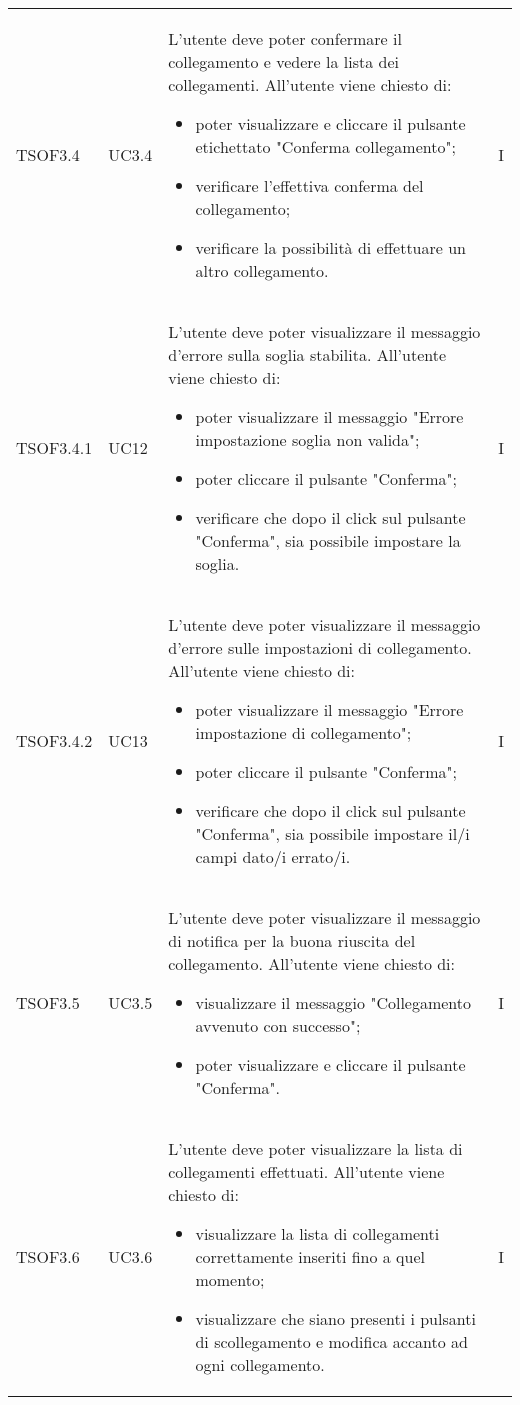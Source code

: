 \begin{longtable}{C{2.5cm} C{2.5cm} L{8cm} C{2cm}}
TSOF3.4 &
UC3.4 &
L'utente  deve poter confermare il collegamento e vedere la lista dei collegamenti. All'utente viene chiesto di:
\begin{itemize}
	\item poter visualizzare e cliccare il pulsante etichettato "Conferma collegamento";
	\item verificare l'effettiva conferma del collegamento;
	\item verificare la possibilità di effettuare un altro collegamento.
\end{itemize}&
I \\

TSOF3.4.1 &
UC12 &
L'utente  deve poter visualizzare il messaggio d'errore sulla soglia stabilita. All'utente viene chiesto di:
\begin{itemize}
	\item poter visualizzare il messaggio "Errore impostazione soglia non valida";
	\item poter cliccare il pulsante "Conferma";
	\item verificare che dopo il click sul pulsante "Conferma", sia possibile impostare la soglia.
\end{itemize} &
I \\

TSOF3.4.2 &
UC13 &
L'utente  deve poter visualizzare il messaggio d'errore sulle impostazioni di collegamento. All'utente viene chiesto di:
\begin{itemize}
	\item poter visualizzare il messaggio "Errore impostazione di collegamento";
	\item poter cliccare il pulsante "Conferma";
	\item verificare che dopo il click sul pulsante "Conferma", sia possibile impostare il/i campi dato/i errato/i.
\end{itemize}&
I \\

TSOF3.5 &
UC3.5 &
L’utente deve poter visualizzare il messaggio di notifica per la buona riuscita del collegamento. All’utente viene chiesto di:
\begin{itemize}
	\item visualizzare il messaggio "Collegamento avvenuto con successo";
	\item poter visualizzare e cliccare il pulsante "Conferma".
\end{itemize}&
I \\

TSOF3.6 &
UC3.6 &
L’utente deve poter visualizzare la lista di collegamenti effettuati. All’utente viene chiesto di:
\begin{itemize}
	\item visualizzare la lista di collegamenti correttamente inseriti fino a quel momento;
	\item visualizzare che siano presenti i pulsanti di scollegamento e modifica accanto ad ogni collegamento.
\end{itemize}&
I \\


\end{longtable}
